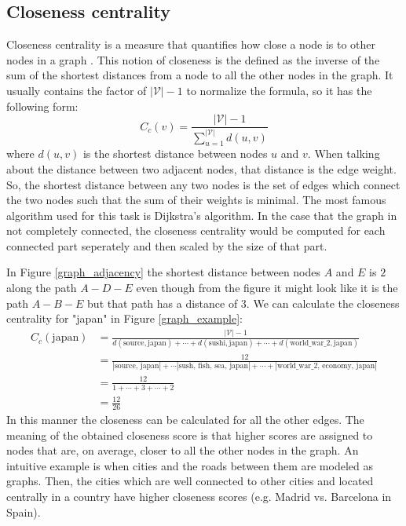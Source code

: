 \documentclass[12pt]{article}
\numberwithin{equation}{section}
\begin{document}
\begin{spacing}{1.5}
	\subsection{Closeness centrality}
	Closeness centrality is a measure that quantifies how close a node is to other nodes in a graph \cite{bavelas}. This notion of closeness is the defined as the inverse of the sum of the shortest distances from a node to all the other nodes in the graph. It usually contains the factor of $|\mathcal{V}|-1$ to normalize the formula, so it has the following form:
	\begin{equation}
		C_c(v) = \frac{|\mathcal{V}|-1}{\sum_{u=1}^{|\mathcal{V}|} d(u,v)}
	\end{equation}
	where $d(u,v)$ is the shortest distance between nodes $u$ and $v$. When talking about the distance between two adjacent nodes, that distance is the edge weight. So, the shortest distance between any two nodes is the set of edges which connect the two nodes such that the sum of their weights is minimal. The most famous algorithm used for this task is Dijkstra's algorithm. In the case that the graph in not completely connected, the closeness centrality would be computed for each connected part seperately and then scaled by the size of that part. 
	
	In Figure \ref{graph_adjacency} the shortest distance between nodes $A$ and $E$ is $2$ along the path $A - D - E$ even though from the figure it might look like it is the path $A - B - E$ but that path has a distance of $3$. We can calculate the closeness centrality for "japan" in Figure \ref{graph_example}: 
	\begin{equation*}
		\begin{split}
			C_c(\text{japan}) & = \frac{|\mathcal{V}|-1}{d(\text{source},\text{japan}) + \cdots + d(\text{sushi},\text{japan}) + \cdots + d(\text{world\_war\_2},\text{japan})} \\
			& = \frac{12}{|\text{source, japan}| + \cdots |\text{sush, fish, sea,  japan}| + \cdots + |\text{world\_war\_2, economy, japan}|} \\
			& = \frac{12}{1 + \cdots + 3 + \cdots + 2} \\
			& = \frac{12}{26}
		\end{split}
	\end{equation*}
	In this manner the closeness can be calculated for all the other edges. The meaning of the obtained closeness score is that higher scores are assigned to nodes that are, on average, closer to all the other nodes in the graph. An intuitive example is when cities and the roads between them are modeled as graphs. Then, the cities which are well connected to other cities and located centrally in a country have higher closeness scores (e.g. Madrid vs. Barcelona in Spain).  
	

\end{spacing}
\end{document}
